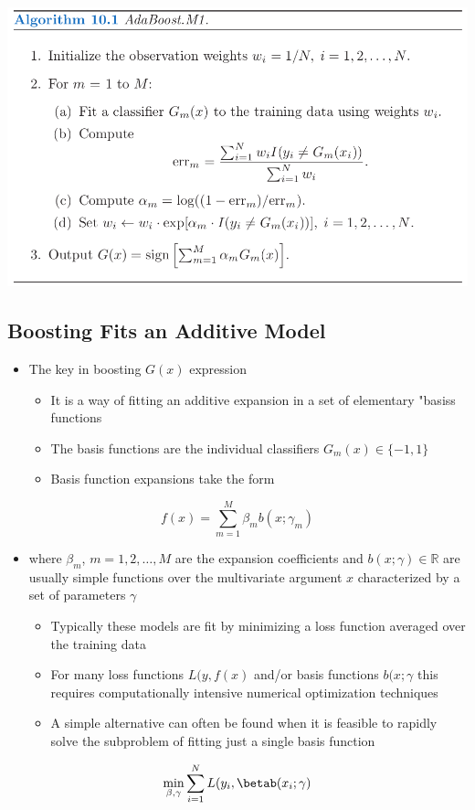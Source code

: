 \documentclass[11pt]{article}
\begin{document}
\begin{center}
\includegraphics[width=.9\linewidth]{Boosting and Additive Trees/screenshot_2018-10-21_20-24-38.png}
\end{center}

\subsection{Boosting Fits an Additive Model}
\label{sec:org17864b5}
\begin{itemize}
\item The key in boosting \(G(x)\) expression
\begin{itemize}
\item It is a way of fitting an additive expansion in a set of elementary "basiss functions
\item The basis functions are the individual classifiers \(G_m(x) \in \{-1,1\}\)
\item Basis function expansions take the form
\end{itemize}
\end{itemize}
\begin{equation}
	f(x) = \sum_{m=1}^M\beta_mb(x; \gamma_m)
\end{equation}
\begin{itemize}
\item where \(\beta_m\), \(m=1,2,\dots,M\) are the expansion coefficients and \(b(x;\gamma) \in \mathbb R\) are usually simple functions over the multivariate argument \(x\) characterized by a set of parameters \(\gamma\)
\begin{itemize}
\item Typically these models are fit by minimizing a loss function averaged over the training data
\item For many loss functions \(L(y, f(x)\) and/or basis functions \(b(x; \gamma\) this requires computationally intensive numerical optimization techniques
\item A simple alternative can often be found when it is feasible to rapidly solve the subproblem of fitting just a single basis function
\end{itemize}
\end{itemize}
\begin{equation}
	\min_{\beta, \gamma} \sum_{i=1}^NL(y_i,\betab(x_i;\gamma)
\end{equation}
\end{document}
